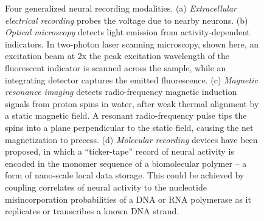 \begin{figure}[htbp]
\centering
\caption{Four generalized neural recording modalities. (a) \emph{Extracellular electrical recording} probes the voltage due to nearby neurons. (b) \emph{Optical microscopy} detects light emission from activity-dependent indicators. In two-photon laser scanning microscopy, shown here, an excitation beam at 2x the peak excitation wavelength of the fluorescent indicator is scanned across the sample, while an integrating detector captures the emitted fluorescence. (c) \emph{Magnetic resonance imaging} detects radio-frequency magnetic induction signals from proton spins in water, after weak thermal alignment by a static magnetic field. A resonant radio-frequency pulse tips the spins into a plane perpendicular to the static field, causing the net magnetization to precess. (d) \emph{Molecular recording} devices have been proposed, in which a “ticker-tape” record of neural activity is encoded in the monomer sequence of a biomolecular polymer – a form of nano-scale local data storage. This could be achieved by coupling correlates of neural activity to the nucleotide misincorporation probabilities of a DNA or RNA polymerase as it replicates or transcribes a known DNA strand.}  \label{fig:modalities}
\hspace{0.1in}

\end{figure}
